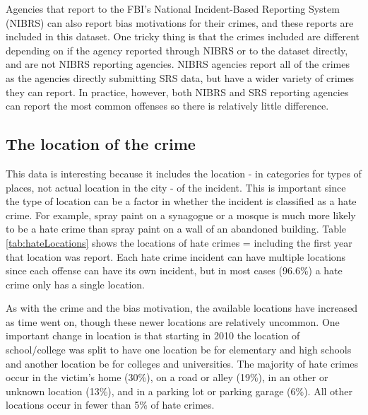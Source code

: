 \documentclass[
  12pt,
  openany]{book}
\begin{document}
Agencies that report to the FBI's National Incident-Based Reporting System (NIBRS) can also report bias motivations for their crimes, and these reports are included in this dataset. One tricky thing is that the crimes included are different depending on if the agency reported through NIBRS or to the dataset directly, and are not NIBRS reporting agencies. NIBRS agencies report all of the crimes as the agencies directly submitting SRS data, but have a wider variety of crimes they can report. In practice, however, both NIBRS and SRS reporting agencies can report the most common offenses so there is relatively little difference.

\subsection{The location of the crime}\label{the-location-of-the-crime}

This data is interesting because it includes the location - in categories for types of places, not actual location in the city - of the incident. This is important since the type of location can be a factor in whether the incident is classified as a hate crime. For example, spray paint on a synagogue or a mosque is much more likely to be a hate crime than spray paint on a wall of an abandoned building. Table \ref{tab:hateLocations} shows the locations of hate crimes = including the first year that location was report. Each hate crime incident can have multiple locations since each offense can have its own incident, but in most cases (96.6\%) a hate crime only has a single location.

As with the crime and the bias motivation, the available locations have increased as time went on, though these newer locations are relatively uncommon. One important change in location is that starting in 2010 the location of school/college was split to have one location be for elementary and high schools and another location be for colleges and universities. The majority of hate crimes occur in the victim's home (30\%), on a road or alley (19\%), in an other or unknown location (13\%), and in a parking lot or parking garage (6\%). All other locations occur in fewer than 5\% of hate crimes.
\end{document}
